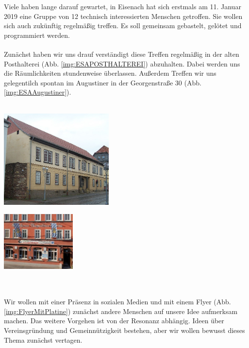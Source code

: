 Viele haben lange darauf gewartet, in Eisenach hat sich erstmals am 11. Januar  2019 eine Gruppe von 12 technisch interessierten Menschen getroffen. Sie wollen sich auch zukünftig regelmä\ss ig treffen. Es soll gemeinsam gebastelt, gelötet und programmiert werden.\\
\ \\
Zunächst haben wir uns drauf verständigt diese Treffen regelmäßig in der alten Posthalterei (Abb. \ref{img:ESAPOSTHALTEREI}) abzuhalten. Dabei werden uns die Räumlichkeiten stundenweise überlassen. Au\ss erdem Treffen wir uns gelegentilch spontan im Augustiner in der Georgenstraße 30 (Abb. \ref{img:ESAAugustiner}).\\
\ \\
\begin{minipage}[t]{0.5\textwidth}
  \centering
  \includegraphics[height=5cm]{pictures/800px-ESAPOSTHALTEREI.jpg}
  \label{img:ESAPOSTHALTEREI}
\end{minipage}
\begin{minipage}[t]{0.5\textwidth}
  \centering
  \includegraphics[height=3cm]{pictures/Augustiner.jpg}
  \label{img:ESAAugustiner}
\end{minipage}
\ \\
\ \\
Wir wollen mit einer Präsenz in sozialen Medien und mit einem Flyer (Abb. \ref{img:FlyerMitPlatine}) zunächst andere Menschen auf unsere Idee aufmerksam machen. Das weitere Vorgehen ist von der Resonanz abhängig. Ideen über Vereinsgründung und Gemeinnützigkeit bestehen, aber wir wollen bewusst dieses Thema zunächst vertagen. \\
\ \\
